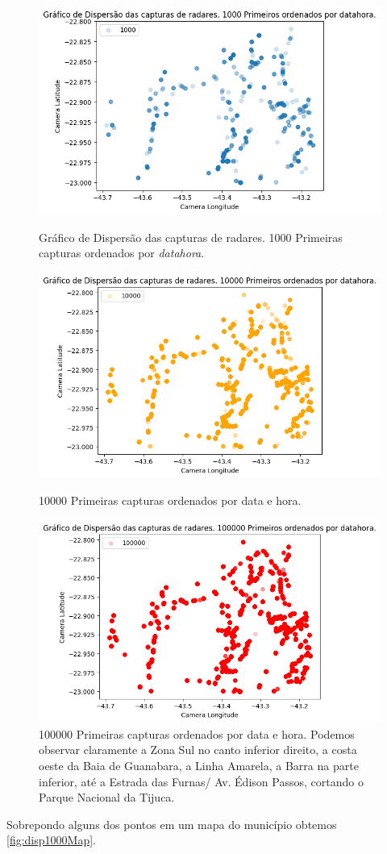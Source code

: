 \documentclass{article}
\begin{document}
\begin{figure}
\centering
\includegraphics[width=0.7\linewidth]{disp1000.png}
\caption{\label{fig:disp1k} Gráfico de Dispersão das capturas de radares. 1000 Primeiras capturas ordenados por \textit{datahora}.}
\includegraphics[width=0.7\linewidth]{disp10k.png}
\caption{\label{fig:disp10k} 10000 Primeiras capturas ordenados por data e hora.}
\includegraphics[width=0.8\linewidth]{disp100k.png}
\caption{\label{fig:disp100k} 100000 Primeiras capturas ordenados por data e hora. Podemos observar claramente a Zona Sul no canto inferior direito, a costa oeste da Baia de Guanabara, a Linha Amarela, a Barra na parte inferior, até a Estrada das Furnas/ Av. Édison Passos, cortando o Parque Nacional da Tijuca.}
\end{figure}

Sobrepondo alguns dos pontos em um mapa do município obtemos \ref{fig:disp1000Map}.
\end{document}
